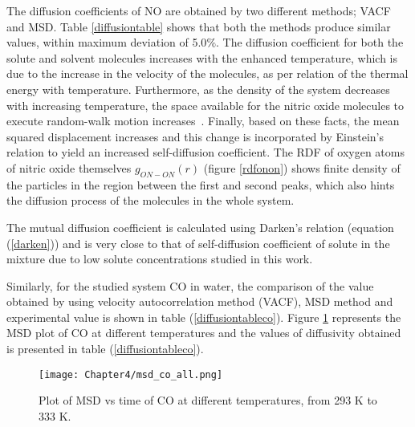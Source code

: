  The diffusion coefficients of NO are obtained by two different methods; VACF and MSD. Table \ref{diffusiontable} shows that both the methods produce similar values, within maximum deviation of 5.0$\%$. The diffusion coefficient for both the solute and solvent
molecules increases with the enhanced temperature, which is due to the increase in the velocity of the molecules, as per relation of the thermal energy with temperature. Furthermore, as the density of the system decreases with increasing temperature, the space available for the nitric
oxide molecules to execute random-walk motion increases~\citep{Thapa2013}. Finally, based on these facts, the mean squared displacement increases and this change is incorporated by Einstein's relation to yield an increased self-diffusion coefficient. The RDF of  oxygen atoms of nitric oxide themselves $g_{ON-ON}(r)$  (figure \ref{rdfonon}) shows finite density of the particles in the region between the first and second peaks, which also hints the diffusion process of the molecules in the whole system.

 The mutual diffusion coefficient is calculated using Darken's relation (equation (\ref{darken})) and is  very close to that of self-diffusion coefficient of solute in the mixture due to low solute concentrations studied in this work.

Similarly, for the studied system CO in water,  the comparison of the value obtained by using velocity autocorrelation method (VACF), MSD method and experimental value is shown in table (\ref{diffusiontableco}). Figure \ref{msdco} represents the MSD plot of CO at different temperatures and the values of diffusivity obtained is  presented in table (\ref{diffusiontableco}).

\begin{figure}[h!]
 \centering
\texttt{[image: Chapter4/msd\_co\_all.png]}
\caption[Plot of MSD vs time of CO at different temperatures. ]{Plot of MSD vs time of CO at different temperatures, from 293 K to 333 K.}
\label{msdco}
\end{figure}

